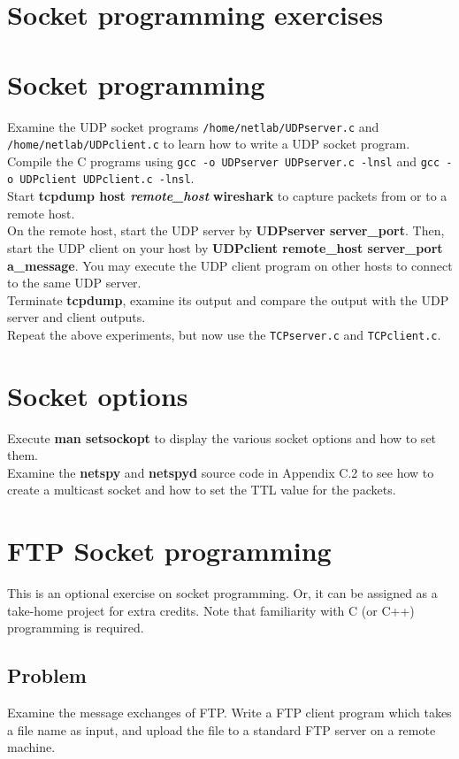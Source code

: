 \documentclass[10pt,a4paper]{article}
\numberwithin{equation}{section}
\numberwithin{figure}{section}
\numberwithin{table}{section}
\begin{document}
\section*{Socket programming exercises}
\section{Socket programming}
    Examine the UDP socket programs \texttt{/home/netlab/UDPserver.c} and \texttt{/home/netlab/UDPclient.c} to learn how to write a UDP socket program.
    Compile the C programs using \texttt{gcc -o UDPserver UDPserver.c -lnsl} and \texttt{gcc -o UDPclient UDPclient.c -lnsl}. \\
    Start \textbf{tcpdump host \textit{remote\_host}} \textbf{wireshark} to capture packets from or to a remote host. \\
    On the remote host, start the UDP server by \textbf{UDPserver server\_port}.
    Then, start the UDP client on your host by \textbf{UDPclient remote\_host server\_port a\_message}.
    You may execute the UDP client program on other hosts to connect to the same UDP server.\\
    Terminate \textbf{tcpdump}, examine its output and compare the output with the UDP server and client outputs.\\
    Repeat the above experiments, but now use the \texttt{TCPserver.c} and \texttt{TCPclient.c}.

\section{Socket options}
    Execute \textbf{man setsockopt} to display the various socket options and how to set them.\\
    Examine the \textbf{netspy} and \textbf{netspyd} source code in Appendix C.2 to see how to create a multicast socket and how to set the TTL value for the packets.

\section{FTP Socket programming}
    This is an optional exercise on socket programming.
    Or, it can be assigned as a take-home project for extra credits.
    Note that familiarity with C (or C++) programming is required.

    \subsection*{Problem}
    Examine the message exchanges of FTP. Write a FTP client program which takes a file name as input, and upload the file to a standard FTP server on a remote machine.
\end{document}

